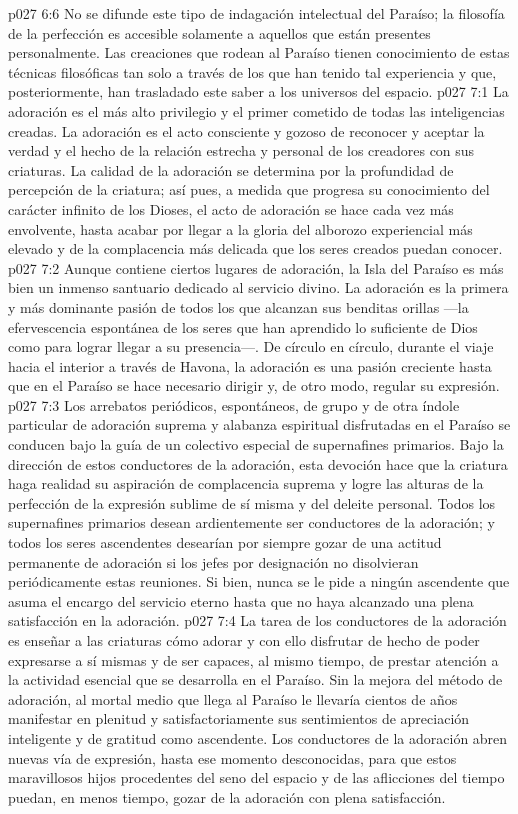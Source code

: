\vs p027 6:6 No se difunde este tipo de indagación intelectual del Paraíso; la filosofía de la perfección es accesible solamente a aquellos que están presentes personalmente. Las creaciones que rodean al Paraíso tienen conocimiento de estas técnicas filosóficas tan solo a través de los que han tenido tal experiencia y que, posteriormente, han trasladado este saber a los universos del espacio.
\vs p027 7:1 La adoración es el más alto privilegio y el primer cometido de todas las inteligencias creadas. La adoración es el acto consciente y gozoso de reconocer y aceptar la verdad y el hecho de la relación estrecha y personal de los creadores con sus criaturas. La calidad de la adoración se determina por la profundidad de percepción de la criatura; así pues, a medida que progresa su conocimiento del carácter infinito de los Dioses, el acto de adoración se hace cada vez más envolvente, hasta acabar por llegar a la gloria del alborozo experiencial más elevado y de la complacencia más delicada que los seres creados puedan conocer.
\vs p027 7:2 \pc Aunque contiene ciertos lugares de adoración, la Isla del Paraíso es más bien un inmenso santuario dedicado al servicio divino. La adoración es la primera y más dominante pasión de todos los que alcanzan sus benditas orillas ---la efervescencia espontánea de los seres que han aprendido lo suficiente de Dios como para lograr llegar a su presencia---. De círculo en círculo, durante el viaje hacia el interior a través de Havona, la adoración es una pasión creciente hasta que en el Paraíso se hace necesario dirigir y, de otro modo, regular su expresión.
\vs p027 7:3 Los arrebatos periódicos, espontáneos, de grupo y de otra índole particular de adoración suprema y alabanza espiritual disfrutadas en el Paraíso se conducen bajo la guía de un colectivo especial de supernafines primarios. Bajo la dirección de estos conductores de la adoración, esta devoción hace que la criatura haga realidad su aspiración de complacencia suprema y logre las alturas de la perfección de la expresión sublime de sí misma y del deleite personal. Todos los supernafines primarios desean ardientemente ser conductores de la adoración; y todos los seres ascendentes desearían por siempre gozar de una actitud permanente de adoración si los jefes por designación no disolvieran periódicamente estas reuniones. Si bien, nunca se le pide a ningún ascendente que asuma el encargo del servicio eterno hasta que no haya alcanzado una plena satisfacción en la adoración.
\vs p027 7:4 \pc La tarea de los conductores de la adoración es enseñar a las criaturas cómo adorar y con ello disfrutar de hecho de poder expresarse a sí mismas y de ser capaces, al mismo tiempo, de prestar atención a la actividad esencial que se desarrolla en el Paraíso. Sin la mejora del método de adoración, al mortal medio que llega al Paraíso le llevaría cientos de años manifestar en plenitud y satisfactoriamente sus sentimientos de apreciación inteligente y de gratitud como ascendente. Los conductores de la adoración abren nuevas vía de expresión, hasta ese momento desconocidas, para que estos maravillosos hijos procedentes del seno del espacio y de las aflicciones del tiempo puedan, en menos tiempo, gozar de la adoración con plena satisfacción.
